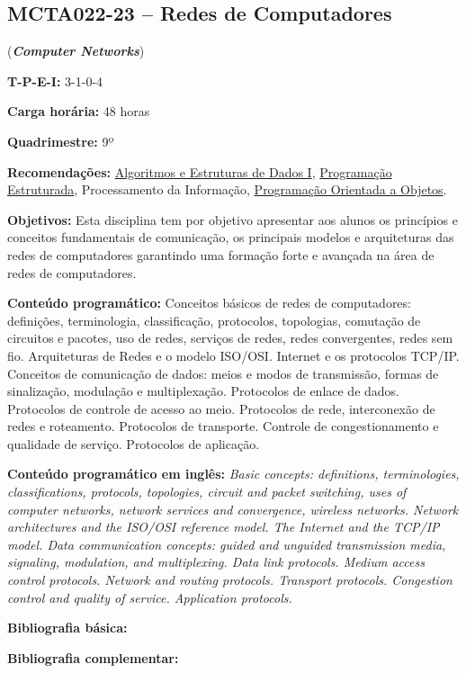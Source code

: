 \documentclass[class=article, crop=false]{standalone}
\begin{document}
\subsection*{MCTA022-23 -- Redes de Computadores}
\label{disc:redes}

(\textbf{\textit{Computer Networks}})

\begin{center}
    \begin{minipage}{0.85\textwidth}
        \textbf{T-P-E-I:} 3-1-0-4
        
        \textbf{Carga horária:} 48 horas
        
        \textbf{Quadrimestre:} 9º
        
        \textbf{Recomendações:} 
        \hyperref[disc:aedI]{Algoritmos e Estruturas de Dados I},
        \hyperref[disc:pe]{Programação Estruturada},
        Processamento da Informação, 
        \hyperref[disc:poo]{Programação Orientada a Objetos}.
    \end{minipage}
\end{center}

\textbf{Objetivos:}
Esta disciplina tem por objetivo apresentar aos alunos os princípios e
conceitos fundamentais de comunicação, os principais modelos e arquiteturas das
redes de computadores garantindo uma formação forte e avançada na área de redes
de computadores. 

\textbf{Conteúdo programático:}
Conceitos básicos de redes de computadores: definições, terminologia,
classificação, protocolos, topologias, comutação de circuitos e pacotes, uso de
redes, serviços de redes, redes convergentes, redes sem fio. 
Arquiteturas de Redes e o modelo ISO/OSI. 
Internet e os protocolos TCP/IP. 
Conceitos de comunicação de dados: meios e modos de transmissão, formas de
sinalização, modulação e multiplexação. 
Protocolos de enlace de dados. 
Protocolos de controle de acesso ao meio. 
Protocolos de rede, interconexão de redes e roteamento. 
Protocolos de transporte. 
Controle de congestionamento e qualidade de serviço. 
Protocolos de aplicação. 

\textbf{Conteúdo programático em inglês:}
\textit{Basic concepts: definitions, terminologies, classifications, protocols, topologies, circuit and packet switching, uses of computer networks, network services and convergence, wireless networks.
Network architectures and the ISO/OSI reference model. 
The Internet and the TCP/IP model. 
Data communication concepts: guided and unguided transmission media, signaling, modulation, and multiplexing. 
Data link protocols. 
Medium access control protocols. 
Network and routing protocols. 
Transport protocols. 
Congestion control and quality of service. 
Application protocols.}

\newrefsection
\textbf{Bibliografia básica:}
\nocite{2003-tanenbaum, 2008-fourozan, 2010-kurose}
\printbibliography

\newrefsection
\textbf{Bibliografia complementar:}
\nocite{2005-halsall, 2007-comer, 2005-stallings, 2007-peterson, 2011-souza}
\printbibliography
\end{document}
